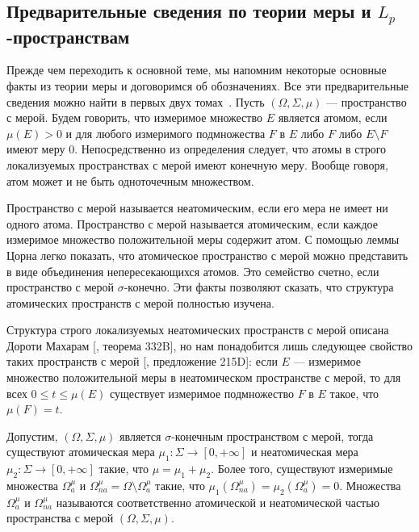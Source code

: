 \subsection{Предварительные сведения по теории 
    меры и \texorpdfstring{$L_p$}{Lp}-пространствам}\label{
        SubSectionPreliminariesOnMeasureTheoryAndLpSpaces}

Прежде чем переходить к основной теме, мы напомним некоторые основные факты из
теории меры и договоримся об обозначениях. Все эти предварительные сведения
можно найти в первых двух томах~\cite{FremMeasTh}. Пусть $(\Omega, \Sigma, \mu)$
--- пространство с мерой. Будем говорить, что измеримое множество $E$ является
атомом, если $\mu(E)>0$ и для любого измеримого подмножества $F$ в $E$ либо $F$
либо $E\setminus F$ имеют меру $0$. Непосредственно из определения следует, что
атомы в строго локализуемых пространствах с мерой имеют конечную меру. Вообще
говоря, атом может и не быть одноточечным множеством.

Пространство с мерой называется неатомическим, если его мера не имеет ни одного
атома. Пространство с мерой называется атомическим, если каждое измеримое
множество положительной меры содержит атом. С помощью леммы Цорна легко
показать, что атомическое пространство с мерой можно представить в виде
объединения непересекающихся атомов.  Это семейство счетно, если пространство с
мерой $\sigma$-конечно. Эти факты позволяют сказать, что структура атомических
пространств с мерой полностью изучена. 

Структура строго локализуемых неатомических пространств с мерой описана Дороти
Махарам [\cite{FremMeasTh}, теорема 332B], но нам понадобится лишь следующее
свойство таких пространств с мерой [\cite{FremMeasTh}, предложение 215D]: если
$E$ --- измеримое множество положительной меры в неатомическом пространстве с
мерой, то для всех $0\leq t\leq \mu(E)$ существует измеримое подмножество $F$ в
$E$ такое, что $\mu(F)=t$.

Допустим, $(\Omega,\Sigma,\mu)$ является $\sigma$-конечным пространством с
мерой, тогда существуют атомическая мера $\mu_1:\Sigma\to[0,+\infty]$ и
неатомическая мера $\mu_2:\Sigma\to[0,+\infty]$ такие, что $\mu=\mu_1+\mu_2$.
Более того, существуют измеримые множества $\Omega_a^{\mu}$ и
$\Omega_{na}^{\mu}=\Omega\setminus \Omega_a^{\mu}$ такие, что
$\mu_1(\Omega_{na}^{\mu})=\mu_2(\Omega_a^{\mu})=0$. Множества $\Omega_a^{\mu}$ и
$\Omega_{na}^{\mu}$ называются соответственно атомической и неатомической частью
пространства с мерой $(\Omega,\Sigma,\mu)$.

